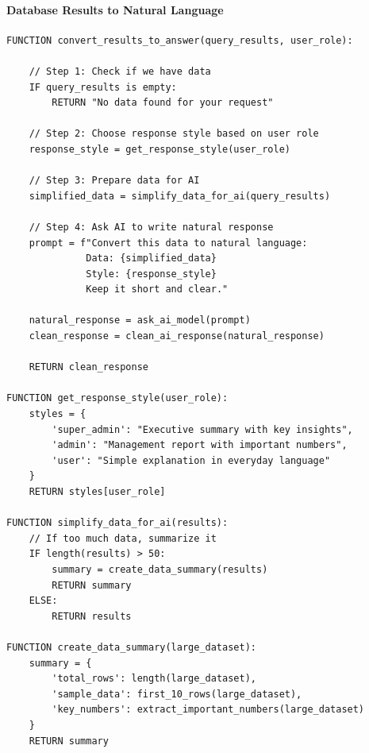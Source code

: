 \paragraph{Database Results to Natural Language}
\begin{verbatim}
FUNCTION convert_results_to_answer(query_results, user_role):
    
    // Step 1: Check if we have data
    IF query_results is empty:
        RETURN "No data found for your request"
    
    // Step 2: Choose response style based on user role
    response_style = get_response_style(user_role)
    
    // Step 3: Prepare data for AI
    simplified_data = simplify_data_for_ai(query_results)
    
    // Step 4: Ask AI to write natural response
    prompt = f"Convert this data to natural language:
              Data: {simplified_data}
              Style: {response_style}
              Keep it short and clear."
    
    natural_response = ask_ai_model(prompt)
    clean_response = clean_ai_response(natural_response)
    
    RETURN clean_response

FUNCTION get_response_style(user_role):
    styles = {
        'super_admin': "Executive summary with key insights",
        'admin': "Management report with important numbers", 
        'user': "Simple explanation in everyday language"
    }
    RETURN styles[user_role]

FUNCTION simplify_data_for_ai(results):
    // If too much data, summarize it
    IF length(results) > 50:
        summary = create_data_summary(results)
        RETURN summary
    ELSE:
        RETURN results

FUNCTION create_data_summary(large_dataset):
    summary = {
        'total_rows': length(large_dataset),
        'sample_data': first_10_rows(large_dataset),
        'key_numbers': extract_important_numbers(large_dataset)
    }
    RETURN summary
\end{verbatim}

